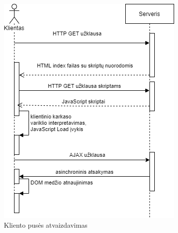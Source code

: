 \begin{figure}[htp!]
\centering
\includegraphics[scale=0.7]{img/csr.png}
\caption{Kliento pusės atvaizdavimas \cite{JavaScriptCrawl}}
\label{fig:csr}
\end{figure}